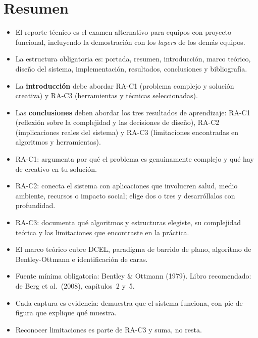\documentclass[12pt, oneside]{article}
\begin{document}
\section*{Resumen}

\begin{itemize}
  \item El reporte técnico es el examen alternativo para equipos con
        proyecto funcional, incluyendo la demostración con los
        \textit{layers} de los demás equipos.
  \item La estructura obligatoria es: portada, resumen, introducción,
        marco teórico, diseño del sistema, implementación, resultados,
        conclusiones y bibliografía.
  \item La \textbf{introducción} debe abordar RA-C1 (problema complejo
        y solución creativa) y RA-C3 (herramientas y técnicas
        seleccionadas).
  \item Las \textbf{conclusiones} deben abordar los tres resultados de
        aprendizaje: RA-C1 (reflexión sobre la complejidad y las
        decisiones de diseño), RA-C2 (implicaciones reales del sistema)
        y RA-C3 (limitaciones encontradas en algoritmos y herramientas).
  \item RA-C1: argumenta por qué el problema es genuinamente complejo
        y qué hay de creativo en tu solución.
  \item RA-C2: conecta el sistema con aplicaciones que involucren
        salud, medio ambiente, recursos o impacto social; elige dos
        o tres y desarróllalos con profundidad.
  \item RA-C3: documenta qué algoritmos y estructuras elegiste,
        su complejidad teórica y las limitaciones que encontraste
        en la práctica.
  \item El marco teórico cubre DCEL, paradigma de barrido de plano,
        algoritmo de Bentley-Ottmann e identificación de caras.
  \item Fuente mínima obligatoria: Bentley \& Ottmann (1979).
        Libro recomendado: de Berg et al.\ (2008), capítulos~2 y~5.
  \item Cada captura es evidencia: demuestra que el sistema funciona,
        con pie de figura que explique qué muestra.
  \item Reconocer limitaciones es parte de RA-C3 y suma, no resta.
\end{itemize}
\end{document}
